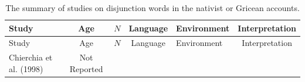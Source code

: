 \documentclass[oneside]{report}
\theoremstyle{definition}
\theoremstyle{definition}
\theoremstyle{definition}
\theoremstyle{remark}
\begin{document}
\begin{longtable}[]{@{}lccclc@{}}
\caption{\label{tab:nativtable} The summary of studies on disjunction words
in the nativist or Gricean accounts.}\tabularnewline
\toprule
\begin{minipage}[b]{0.23\columnwidth}\raggedright\strut
Study\strut
\end{minipage} & \begin{minipage}[b]{0.07\columnwidth}\centering\strut
Age\strut
\end{minipage} & \begin{minipage}[b]{0.05\columnwidth}\centering\strut
\(N\)\strut
\end{minipage} & \begin{minipage}[b]{0.10\columnwidth}\centering\strut
Language\strut
\end{minipage} & \begin{minipage}[b]{0.25\columnwidth}\raggedright\strut
Environment\strut
\end{minipage} & \begin{minipage}[b]{0.13\columnwidth}\centering\strut
Interpretation\strut
\end{minipage}\tabularnewline
\midrule
\endfirsthead
\toprule
\begin{minipage}[b]{0.23\columnwidth}\raggedright\strut
Study\strut
\end{minipage} & \begin{minipage}[b]{0.07\columnwidth}\centering\strut
Age\strut
\end{minipage} & \begin{minipage}[b]{0.05\columnwidth}\centering\strut
\(N\)\strut
\end{minipage} & \begin{minipage}[b]{0.10\columnwidth}\centering\strut
Language\strut
\end{minipage} & \begin{minipage}[b]{0.25\columnwidth}\raggedright\strut
Environment\strut
\end{minipage} & \begin{minipage}[b]{0.13\columnwidth}\centering\strut
Interpretation\strut
\end{minipage}\tabularnewline
\midrule
\endhead
\begin{minipage}[t]{0.23\columnwidth}\raggedright\strut
Chierchia et al. (1998)\strut
\end{minipage} & \begin{minipage}[t]{0.07\columnwidth}\centering\strut
Not Reported\strut
\end{minipage} & \begin{minipage}[t]{0.05\columnwidth}\centering\strut

\end{minipage}
\end{longtable}
\end{document}
